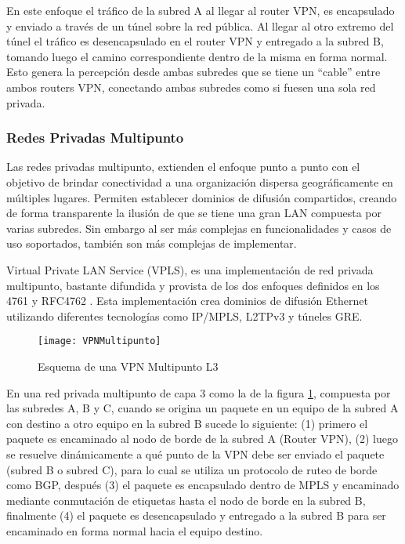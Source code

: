 En este enfoque el tr\'afico de la subred A al llegar al router VPN, es encapsulado y enviado a trav\'es de un túnel sobre la red p\'ublica. Al llegar al otro extremo del túnel el tr\'afico es desencapsulado en el router VPN y entregado a la subred B, tomando luego el camino correspondiente dentro de la misma en forma normal. Esto genera la percepci\'on desde ambas subredes que se tiene un “cable” entre ambos routers VPN, conectando ambas subredes como si fuesen una sola red privada.
 
\subsubsection{Redes Privadas Multipunto}

Las redes privadas multipunto, extienden el enfoque punto a punto con el objetivo de brindar conectividad a una organizaci\'on dispersa geogr\'aficamente en m\'ultiples lugares. Permiten establecer dominios de difusi\'on compartidos, creando de forma transparente la ilusi\'on de que se tiene una gran LAN compuesta por varias subredes. Sin embargo al ser m\'as complejas en funcionalidades y casos de uso soportados, tambi\'en son m\'as complejas de implementar.

Virtual Private LAN Service (VPLS), es una implementaci\'on de red privada multipunto, bastante difundida y provista de los dos enfoques definidos en los 4761 \citep{kompella2007virtual} y RFC4762 \cite{lasserre2007virtual}. Esta implementaci\'on crea dominios de difusión Ethernet utilizando diferentes tecnologías como IP/MPLS, L2TPv3 y túneles GRE.

\begin{figure}[htbp!] 
\centering    
\texttt{[image: VPNMultipunto]}
\caption[Esquema de una VPN Multipunto ]{Esquema de una VPN Multipunto L3}
\label{fig:VPNMulipunto}
\end{figure}
 
En una red privada multipunto de capa 3 como la de la figura \ref{fig:VPNMulipunto}, compuesta por las subredes A, B y C, cuando se origina un paquete en un equipo de la subred A con destino a otro equipo en la subred B sucede lo siguiente: (1) primero el paquete es encaminado al nodo de borde de la subred A (Router VPN), (2) luego se resuelve din\'amicamente a qu\'e punto de la VPN debe ser enviado el paquete (subred B o subred C), para lo cual se utiliza un protocolo de ruteo de borde como BGP, después (3) el paquete es encapsulado dentro de MPLS y encaminado mediante conmutaci\'on de etiquetas hasta el nodo de borde en la subred B, finalmente (4) el paquete es desencapsulado y entregado a la subred B para ser encaminado en forma normal hacia el equipo destino.

